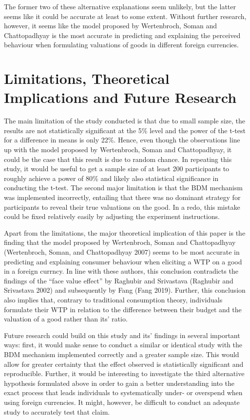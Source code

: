 \documentclass[
]{report}
\begin{document}
The former two of these alternative explanations seem unlikely, but the
latter seems like it could be accurate at least to some extent. Without
further research, however, it seems like the model proposed by
Wertenbroch, Soman and Chattopadhyay is the most accurate in predicting
and explaining the perceived behaviour when formulating valuations of
goods in different foreign currencies.

\section{Limitations, Theoretical Implications and Future
Research}\label{limitations-theoretical-implications-and-future-research}

The main limitation of the study conducted is that due to small sample
size, the results are not statistically significant at the 5\% level and
the power of the t-test for a difference in means is only 22\%. Hence,
even though the observations line up with the model proposed by
Wertenbroch, Soman and Chattopadhyay, it could be the case that this
result is due to random chance. In repeating this study, it would be
useful to get a sample size of at least 200 participants to roughly
achieve a power of 80\% and likely also statistical significance in
conducting the t-test. The second major limitation is that the BDM
mechanism was implemented incorrectly, entailing that there was no
dominant strategy for participants to reveal their true valuations on
the good. In a redo, this mistake could be fixed relatively easily by
adjusting the experiment instructions.

Apart from the limitations, the major theoretical implication of this
paper is the finding that the model proposed by Wertenbroch, Soman and
Chattopadhyay (Wertenbroch, Soman, and Chattopadhyay 2007) seems to be
most accurate in predicting and explaining consumer behaviour when
eliciting a WTP on a good in a foreign currncy. In line with these
authors, this conclusion contradicts the findings of the ``face value
effect'' by Raghubir and Srivastava (Raghubir and Srivastava 2002) and
subsequently by Fang (Fang 2019). Further, this conclusion also implies
that, contrary to traditional consumption theory, individuals formulate
their WTP in relation to the difference between their budget and the
valuation of a good rather than its' ratio.

Future research could build on this study and its' findings in several
important ways: first, it would make sense to conduct a similar or
identical study with the BDM mechanism implemented correctly and a
greater sample size. This would allow for greater certainty that the
effect observed is statistically significant and reproducible. Further,
it would be interesting to investigate the third alternative hypothesis
formulated above in order to gain a better understanding into the exact
process that leads individuals to systematically under- or overspend
when using foreign currencies. It might, however, be difficult to
conduct an adequate study to accurately test that claim.
\end{document}
